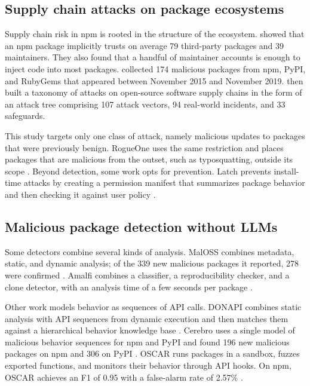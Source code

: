 \documentclass[a4paper,fleqn]{cas-dc}
\begin{document}
\subsection{Supply chain attacks on package ecosystems}
Supply chain risk in npm is rooted in the structure of the ecosystem.
\citet{zimmermann2019small} showed that an npm package implicitly trusts on
average 79 third-party packages and 39 maintainers. They also found that a
handful of maintainer accounts is enough to inject code into most packages.
\citet{ohm2020backstabber} collected 174 malicious packages from npm, PyPI, and
RubyGems that appeared between November 2015 and November 2019.
\citet{ladisa2023sok} then built a taxonomy of attacks on open-source
software supply chains in the form of an attack tree comprising 107 attack
vectors, 94 real-world incidents, and 33 safeguards.

This study targets only one class of attack, namely malicious updates to
packages that were previously benign. RogueOne uses the same restriction and
places packages that are malicious from the outset, such as
typosquatting, outside its scope \citep{sofaer2024rogueone}. Beyond
detection, some work opts for prevention. Latch prevents install-time attacks by
creating a permission manifest that summarizes package behavior and then
checking it against user policy \citep{wyss2022wolf}.

\subsection{Malicious package detection without LLMs}
Some detectors combine several kinds of analysis. MalOSS combines metadata,
static, and dynamic analysis; of the 339 new malicious packages it reported, 278
were confirmed \citep{duan2021towards}. Amalfi combines a classifier, a
reproducibility checker, and a clone detector, with an analysis time of a few
seconds per package \citep{sejfia2022practical}.

Other work models behavior as sequences of API calls. DONAPI combines static
analysis with API sequences from dynamic execution and then matches them against
a hierarchical behavior knowledge base \citep{huang2024donapi}. Cerebro uses a
single model of malicious behavior sequences for npm and PyPI and found 196 new
malicious packages on npm and 306 on PyPI \citep{zhang2025killing}. OSCAR runs
packages in a sandbox, fuzzes exported functions, and monitors
their behavior through API hooks. On npm, OSCAR achieves an F1 of 0.95
with a false-alarm rate of 2.57\% \citep{zheng2024towards}.
\end{document}
